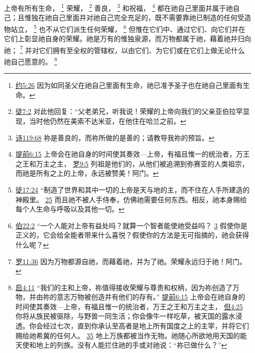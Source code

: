 \documentclass[12pt, a4paper, oneside]{ctexart}
\newcounter{parnum}[section]
\newcommand{\N}{%
   \noindent\refstepcounter{parnum}%
    \makebox[\parindent][l]{\textbf{\arabic{parnum}.}}}
\begin{document}
\N 上帝有所有生命，
	\footnote {
		\href{https://biblehub.com/john/5-26.htm}{约5:26} 因为如同圣父在祂自己里面有生命，祂已准予圣子也在祂自己里面有生命。
	}
	荣耀，
	\footnote {
		\href{https://biblehub.com/acts/7-2.htm}{徒7:2} 对此他回复：“父老弟兄，听我说！荣耀的上帝向我们的父亲亚伯拉罕显现，当时他仍然在美索不达米亚，在他住在哈兰之前。
	}
	善良，
	\footnote {
		\href{https://biblehub.com/psalms/119-68.htm}{诗119:68} 祢是善良的，而祢所做的是善的；请教导我祢的预旨。
	}
	和祝福，
	\footnote {
		\href{https://biblehub.com/1_timothy/6-15.htm}{提前6:15} 上帝会在祂自身的时间使其奏效---上帝，有福且惟一的统治者，万王之王和万主之主，
		\href{https://biblehub.com/romans/9-5.htm}{罗9:5} 列祖是他们的，从他们被追溯到弥赛亚的人类祖宗，而祂是所有之上的上帝，永远被赞美！阿门。
	}
	都在祂自己里面并属于祂自己；且惟独在祂自己里面并对祂自己完全充足的，既不需要靠祂已制造的任何受造物站立，
	\footnote {
		\href{https://biblehub.com/acts/17-24.htm}{徒17:24} “制造了世界和其中一切的上帝是天与地的主，而不住在人手所建造的神殿里。
		\href{https://biblehub.com/acts/17-25.htm}{25} 而且祂不被人手侍奉，仿佛祂需要任何东西。相反，祂本身赐给每个人生命与呼吸以及其他一切。
	}
	也不从它们派生任何荣耀，
	\footnote {
		\href{https://biblehub.com/job/22-2.htm}{伯22:2} “一个人能对上帝有益处吗？就算一个智者能使祂受益吗？
		\href{https://biblehub.com/job/22-3.htm}{3} 假使你是正义的，它会给全能者带来什么喜悦？假使你的方法是无可指摘的，祂会获得什么呢？
	}
	但惟在它们中、通过它们、向它们并在它们上彰显祂自身的荣耀。祂是万有的惟独泉源，而万物都属于祂，藉着祂并归向祂；
	\footnote {
		\href{https://biblehub.com/romans/11-36.htm}{罗11:36} 因为万物都源自祂，而藉着祂，并为了祂。荣耀永远归于祂！阿门。
	}
	并对它们拥有至全权的管辖权，以由它们、为它们或在它们上做无论什么祂自己愿意的。
	\footnote {
		\href{https://biblehub.com/revelation/4-11.htm}{启4:11} “我们的主和上帝，祢值得接收荣耀与尊贵和权柄，因为祢创造了万物，并由祢的意志万物被创造并有他们的存有。”
		\href{https://biblehub.com/1_timothy/6-15.htm}{提前6:15} 上帝会在祂自身的时间使其奏效---上帝，有福且惟一的统治者，万王之王和万主之主，
		\href{https://biblehub.com/daniel/4-25.htm}{但4:25} 你将从族民被驱除，与野兽一同生活；你会像牛一样吃草，被天国的露水浸透。你会经过七次，直到你承认至高者是地上所有国度之上的主宰，并将它们赐给祂希冀的任何人。
		\href{https://biblehub.com/daniel/4-35.htm}{35} 地上万族都被当作无物。祂随心所欲地用天国的能天使和地上的列族。没有人能拦住祂的手或对祂说：“祢已做什么？”
	}
\end{document}
